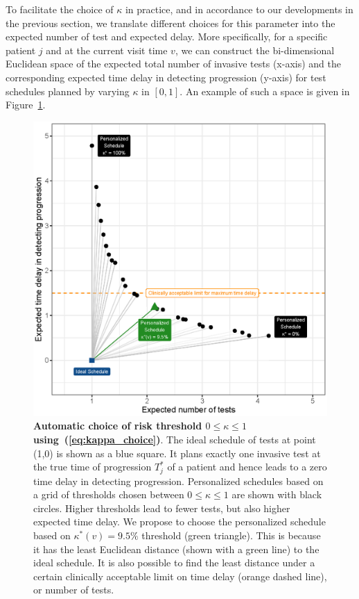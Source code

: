 To facilitate the choice of $\kappa$ in practice, and in accordance to our developments in the previous section, we translate different choices for this parameter into the expected number of test and expected delay. More specifically, for a specific patient $j$ and at the current visit time $v$, we can construct the bi-dimensional Euclidean space of the expected total number of invasive tests (x-axis) and the corresponding expected time delay in detecting progression (y-axis) for test schedules planned by varying $\kappa$ in $[0, 1]$. An example of such a space is given in Figure~\ref{fig:kappa_choice}.
\begin{figure}
\centerline{\includegraphics{images/kappa_choice_102.eps}}
\caption{\textbf{Automatic choice of risk threshold $0 \leq \kappa \leq 1$ using~(\ref{eq:kappa_choice})}. The ideal schedule of tests at point (1,0) is shown as a blue square. It plans exactly one invasive test at the true time of progression $T^*_j$ of a patient and hence leads to a zero time delay in detecting progression. Personalized schedules based on a grid of thresholds chosen between $0 \leq \kappa \leq 1$ are shown with black circles. Higher thresholds lead to fewer tests, but also higher expected time delay. We propose to choose the personalized schedule based on $\kappa^*(v)=9.5\%$ threshold (green triangle). This is because it has the least Euclidean distance (shown with a green line) to the ideal schedule. It is also possible to find the least distance under a certain clinically acceptable limit on time delay (orange dashed line), or number of tests.}
\label{fig:kappa_choice}
\end{figure}
